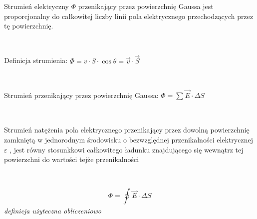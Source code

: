 \documentclass{article}
\begin{document}
            Strumień elektryczny $\Phi$ przenikający przez powierzchnię
            Gaussa jest proporcjonalny do całkowitej liczby linii pola
            elektrycznego przechodzących przez tę powierzchnię.

            \

            Definicja strumienia:
            $\Phi = v\cdotp S \cdotp \cos\theta = \vec{v} \cdotp 
            \vec{S}$

            \
            
            Strumień przenikający przez powierzchnię Gaussa:
            $\Phi = \sum\nolimits_{}\vec{E} \cdotp \Delta S$

            \

            Strumień natężenia pola elektrycznego przenikający przez
            dowolną powierzchnię zamkniętą w jednorodnym środowisku
            o bezwzględnej przenikalności elektrycznej $\varepsilon$
            , jest równy stosunkkowi całkowitego ładunku znajdującego
            się wewnątrz tej powierzchni do wartości tejże przenikalności
            
            \
            
            \begin{equation}
                \Phi = \oint\nolimits_{} \vec{E}\cdotp\Delta S
            \end{equation}
            \textit{definicja użyteczna obliczeniowo}
        
\end{document}
